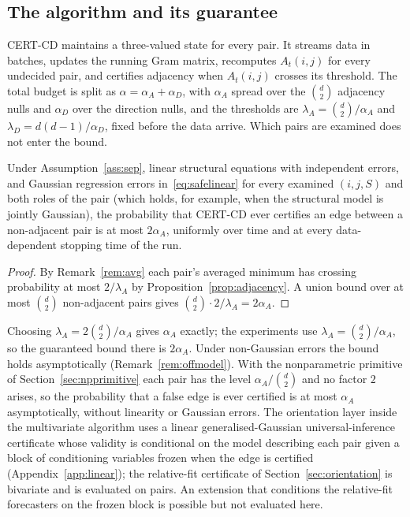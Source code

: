 \subsection{The algorithm and its guarantee}\label{sec:algorithm}


CERT-CD maintains a three-valued state for every pair. It streams data in
batches, updates the running Gram matrix, recomputes $A_t(i,j)$ for every
undecided pair, and certifies adjacency when $A_t(i,j)$ crosses its threshold.
The total budget is split as $\alpha=\alpha_A+\alpha_D$, with $\alpha_A$ spread
over the $\binom d2$ adjacency nulls and $\alpha_D$ over the direction nulls,
and the thresholds are $\lambda_A=\binom d2/\alpha_A$ and
$\lambda_D=d(d-1)/\alpha_D$, fixed before the data arrive. Which pairs are
examined does not enter the bound.

\begin{theorem}[Adjacency]\label{thm:main}
Under Assumption~\ref{ass:sep}, linear structural equations with independent
errors, and Gaussian regression errors in~\eqref{eq:safelinear} for every
examined $(i,j,S)$ and both roles of the pair (which holds, for example, when the
structural model is jointly Gaussian), the probability that CERT-CD ever certifies an edge between
a non-adjacent pair is at most $2\alpha_A$, uniformly over time and at every
data-dependent stopping time of the run.
\end{theorem}

\begin{proof}
By Remark~\ref{rem:avg} each pair's averaged minimum has crossing probability at
most $2/\lambda_A$ by Proposition~\ref{prop:adjacency}. A union bound over at
most $\binom d2$ non-adjacent pairs gives $\binom d2\cdot 2/\lambda_A=2\alpha_A$.
\end{proof}

\noindent Choosing $\lambda_A=2\binom d2/\alpha_A$ gives $\alpha_A$ exactly; the
experiments use $\lambda_A=\binom d2/\alpha_A$, so the guaranteed bound there is
$2\alpha_A$. Under non-Gaussian errors the bound holds asymptotically
(Remark~\ref{rem:offmodel}). With the nonparametric primitive of
Section~\ref{sec:npprimitive} each pair has the level $\alpha_A/\binom d2$ and no
factor $2$ arises, so the probability that a false edge is ever certified is at
most $\alpha_A$ asymptotically, without linearity or Gaussian errors. The orientation layer inside the multivariate
algorithm uses a linear generalised-Gaussian universal-inference certificate
whose validity is conditional on the model describing each pair given a block
of conditioning variables frozen when the edge is certified
(Appendix~\ref{app:linear}); the relative-fit certificate of
Section~\ref{sec:orientation} is bivariate and is evaluated on pairs. An
extension that conditions the relative-fit forecasters on the frozen block is
possible but not evaluated here.

